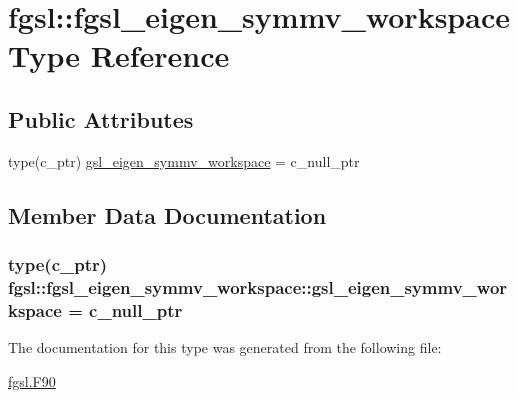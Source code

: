 \hypertarget{structfgsl_1_1fgsl__eigen__symmv__workspace}{}\section{fgsl\+:\+:fgsl\+\_\+eigen\+\_\+symmv\+\_\+workspace Type Reference}
\label{structfgsl_1_1fgsl__eigen__symmv__workspace}
\subsection*{Public Attributes}
\begin{DoxyCompactItemize}
\item 
type(c\+\_\+ptr) \hyperlink{structfgsl_1_1fgsl__eigen__symmv__workspace_af4f6039413c7ee3bb9eb8e8ca9474ad4}{gsl\+\_\+eigen\+\_\+symmv\+\_\+workspace} = c\+\_\+null\+\_\+ptr
\end{DoxyCompactItemize}


\subsection{Member Data Documentation}
\hypertarget{structfgsl_1_1fgsl__eigen__symmv__workspace_af4f6039413c7ee3bb9eb8e8ca9474ad4}{}
\subsubsection[{gsl\+\_\+eigen\+\_\+symmv\+\_\+workspace}]{\setlength{\rightskip}{0pt plus 5cm}type(c\+\_\+ptr) fgsl\+::fgsl\+\_\+eigen\+\_\+symmv\+\_\+workspace\+::gsl\+\_\+eigen\+\_\+symmv\+\_\+workspace = c\+\_\+null\+\_\+ptr}\label{structfgsl_1_1fgsl__eigen__symmv__workspace_af4f6039413c7ee3bb9eb8e8ca9474ad4}


The documentation for this type was generated from the following file\+:\begin{DoxyCompactItemize}
\item 
\hyperlink{fgsl_8F90}{fgsl.\+F90}\end{DoxyCompactItemize}
